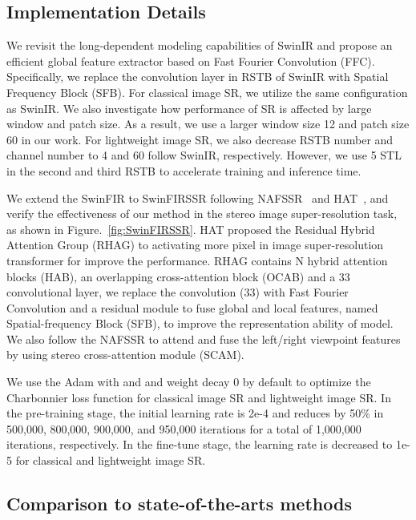 \documentclass[10pt,twocolumn,letterpaper]{article}
\begin{document}
\subsection{Implementation Details}
We revisit the long-dependent modeling capabilities of SwinIR and propose an efficient global feature extractor based on Fast Fourier Convolution (FFC). Specifically, we replace the convolution layer in RSTB of SwinIR with Spatial Frequency Block (SFB). For classical image SR, we utilize the same configuration as SwinIR.
We also investigate how performance of SR is affected by large window and patch size. As a result, we use a larger window size 12 and patch size 60 in our work. For lightweight image SR, we also decrease RSTB number and channel number to 4 and 60 follow SwinIR, respectively. However, we use 5 STL in the second and third RSTB to accelerate training and inference time.



We extend the SwinFIR to SwinFIRSSR following NAFSSR~\cite{chu2022nafssr} and HAT~\cite{chen2022activating}, and verify the effectiveness of our method in the stereo image super-resolution task, as shown in Figure.~\ref{fig:SwinFIRSSR}. HAT proposed the Residual Hybrid Attention Group (RHAG) to activating more pixel in image super-resolution transformer for improve the performance. RHAG contains N hybrid attention blocks (HAB), an overlapping cross-attention block (OCAB) and a 33 convolutional layer, we replace the convolution (33) with Fast Fourier Convolution and a residual module to fuse global and local features, named Spatial-frequency Block (SFB), to improve the representation ability of model. We also follow the NAFSSR to attend and fuse the left/right viewpoint features by using stereo cross-attention module (SCAM). 

We use the Adam with  and  and weight decay 0 by default to optimize the Charbonnier loss function for classical image SR and lightweight image SR. In the pre-training stage, the initial learning rate is 2e-4 and reduces by 50\% in 500,000, 800,000, 900,000, and 950,000 iterations for a total of 1,000,000 iterations, respectively. In the fine-tune stage, the learning rate is decreased to 1e-5 for classical and lightweight image SR. 



\subsection{Comparison to state-of-the-arts methods}
\end{document}
